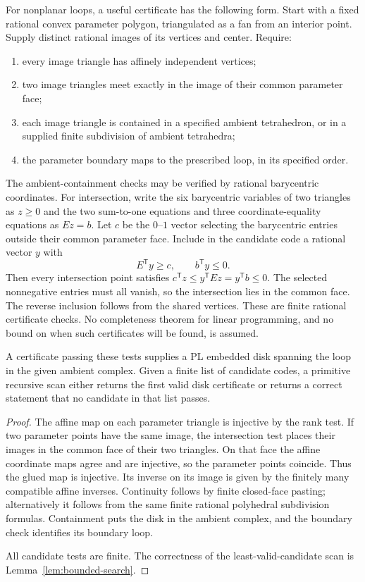 For nonplanar loops, a useful certificate has the following form. Start with a fixed rational convex parameter polygon, triangulated as a fan from an interior point. Supply distinct rational images of its vertices and center. Require:
\begin{enumerate}
\item every image triangle has affinely independent vertices;
\item two image triangles meet exactly in the image of their common parameter face;
\item each image triangle is contained in a specified ambient tetrahedron, or in a supplied finite subdivision of ambient tetrahedra;
\item the parameter boundary maps to the prescribed loop, in its specified order.
\end{enumerate}
The ambient-containment checks may be verified by rational barycentric coordinates. For intersection, write the six barycentric variables of two triangles as $z\geq0$ and the two sum-to-one equations and three coordinate-equality equations as $Ez=b$. Let $c$ be the $0$--$1$ vector selecting the barycentric entries outside their common parameter face. Include in the candidate code a rational vector $y$ with
\[
 E^{\mathsf T}y\geq c,\qquad b^{\mathsf T}y\leq0.
\]
Then every intersection point satisfies
$c^{\mathsf T}z\leq y^{\mathsf T}Ez=y^{\mathsf T}b\leq0$.
The selected nonnegative entries must all vanish, so the intersection lies in the common face. The reverse inclusion follows from the shared vertices. These are finite rational certificate checks. No completeness theorem for linear programming, and no bound on when such certificates will be found, is assumed.

\begin{proposition}\label{prop:disk-certificate}
A certificate passing these tests supplies a PL embedded disk spanning the loop in the given ambient complex. Given a finite list of candidate codes, a primitive recursive scan either returns the first valid disk certificate or returns a correct statement that no candidate in that list passes.
\end{proposition}
\begin{proof}
The affine map on each parameter triangle is injective by the rank test. If two parameter points have the same image, the intersection test places their images in the common face of their two triangles. On that face the affine coordinate maps agree and are injective, so the parameter points coincide. Thus the glued map is injective. Its inverse on its image is given by the finitely many compatible affine inverses. Continuity follows by finite closed-face pasting; alternatively it follows from the same finite rational polyhedral subdivision formulas. Containment puts the disk in the ambient complex, and the boundary check identifies its boundary loop.

All candidate tests are finite. The correctness of the least-valid-candidate scan is Lemma~\ref{lem:bounded-search}.
\end{proof}

